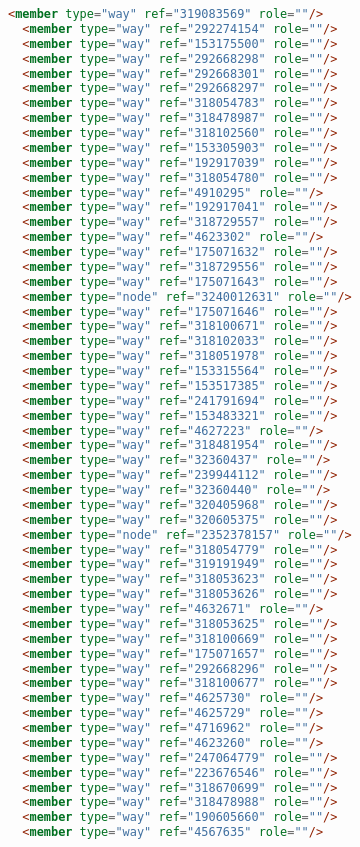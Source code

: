\begin{lstlisting}[language=HTML,basicstyle=\tiny,caption=bandung1.xml]
  <member type="way" ref="319083569" role=""/>
  <member type="way" ref="292274154" role=""/>
  <member type="way" ref="153175500" role=""/>
  <member type="way" ref="292668298" role=""/>
  <member type="way" ref="292668301" role=""/>
  <member type="way" ref="292668297" role=""/>
  <member type="way" ref="318054783" role=""/>
  <member type="way" ref="318478987" role=""/>
  <member type="way" ref="318102560" role=""/>
  <member type="way" ref="153305903" role=""/>
  <member type="way" ref="192917039" role=""/>
  <member type="way" ref="318054780" role=""/>
  <member type="way" ref="4910295" role=""/>
  <member type="way" ref="192917041" role=""/>
  <member type="way" ref="318729557" role=""/>
  <member type="way" ref="4623302" role=""/>
  <member type="way" ref="175071632" role=""/>
  <member type="way" ref="318729556" role=""/>
  <member type="way" ref="175071643" role=""/>
  <member type="node" ref="3240012631" role=""/>
  <member type="way" ref="175071646" role=""/>
  <member type="way" ref="318100671" role=""/>
  <member type="way" ref="318102033" role=""/>
  <member type="way" ref="318051978" role=""/>
  <member type="way" ref="153315564" role=""/>
  <member type="way" ref="153517385" role=""/>
  <member type="way" ref="241791694" role=""/>
  <member type="way" ref="153483321" role=""/>
  <member type="way" ref="4627223" role=""/>
  <member type="way" ref="318481954" role=""/>
  <member type="way" ref="32360437" role=""/>
  <member type="way" ref="239944112" role=""/>
  <member type="way" ref="32360440" role=""/>
  <member type="way" ref="320405968" role=""/>
  <member type="way" ref="320605375" role=""/>
  <member type="node" ref="2352378157" role=""/>
  <member type="way" ref="318054779" role=""/>
  <member type="way" ref="319191949" role=""/>
  <member type="way" ref="318053623" role=""/>
  <member type="way" ref="318053626" role=""/>
  <member type="way" ref="4632671" role=""/>
  <member type="way" ref="318053625" role=""/>
  <member type="way" ref="318100669" role=""/>
  <member type="way" ref="175071657" role=""/>
  <member type="way" ref="292668296" role=""/>
  <member type="way" ref="318100677" role=""/>
  <member type="way" ref="4625730" role=""/>
  <member type="way" ref="4625729" role=""/>
  <member type="way" ref="4716962" role=""/>
  <member type="way" ref="4623260" role=""/>
  <member type="way" ref="247064779" role=""/>
  <member type="way" ref="223676546" role=""/>
  <member type="way" ref="318670699" role=""/>
  <member type="way" ref="318478988" role=""/>
  <member type="way" ref="190605660" role=""/>
  <member type="way" ref="4567635" role=""/>

\end{lstlisting}
